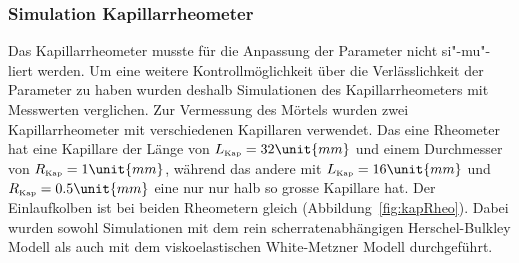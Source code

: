 \subsubsection{Simulation Kapillarrheometer}
Das Kapillarrheometer musste für die Anpassung der Parameter nicht si"-mu"-liert werden. Um eine weitere Kontrollmöglichkeit über die Verlässlichkeit der Parameter zu haben wurden deshalb Simulationen des Kapillarrheometers mit Messwerten verglichen.
Zur Vermessung des Mörtels wurden zwei Kapillarrheometer mit verschiedenen Kapillaren verwendet. 
Das eine Rheometer hat eine Kapillare der Länge von $L_\text{\tiny Kap}=32\unit{mm}$ und einem Durchmesser von $R_\text{\tiny Kap}=1\unit{mm}$, während das andere mit $L_\text{\tiny Kap}=16\unit{mm}$ und $R_\text{\tiny Kap}=0.5\unit{mm}$ eine nur nur halb so grosse Kapillare hat. Der Einlaufkolben ist bei beiden Rheometern gleich (Abbildung~\ref{fig:kapRheo}).
Dabei wurden sowohl Simulationen mit dem rein scherratenabhängigen Herschel-Bulkley Modell als auch mit dem viskoelastischen White-Metzner Modell durchgeführt.

